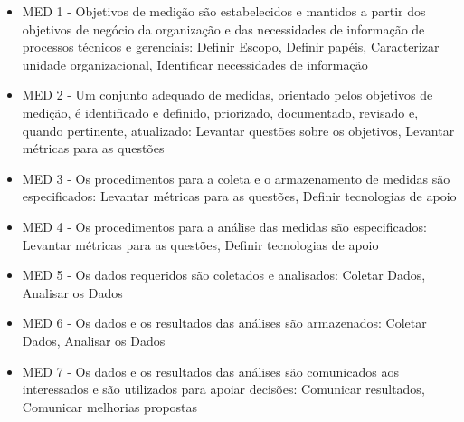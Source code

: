 \begin{itemize}
\item MED 1 - Objetivos   de  medição   são   estabelecidos   e  mantidos  a  partir   dos 
objetivos   de   negócio   da   organização   e   das   necessidades   de informação de processos técnicos e gerenciais: Definir Escopo, Definir papéis, Caracterizar unidade organizacional, Identificar necessidades de informação
\item MED 2 - Um  conjunto  adequado  de  medidas,  orientado  pelos  objetivos  de medição,  é  identificado  e  definido,  priorizado,  documentado,  revisado 
e, quando pertinente, atualizado: Levantar questões sobre os objetivos, Levantar métricas para as questões
\item MED 3 - Os  procedimentos  para  a  coleta  e  o  armazenamento  de  medidas  são especificados: Levantar métricas para as questões,  Definir tecnologias de apoio
\item MED 4 - Os procedimentos para a análise das medidas são especificados: Levantar métricas para as questões, Definir tecnologias de apoio
\item MED 5 - Os dados requeridos são coletados e analisados: Coletar Dados, Analisar os Dados
\item MED 6 - Os dados e os resultados das análises são armazenados: Coletar Dados, Analisar os Dados
\item MED 7 - Os   dados   e   os   resultados   das   análises   são   comunicados   aos interessados e são utilizados para apoiar decisões: Comunicar resultados, Comunicar melhorias propostas

\end{itemize}